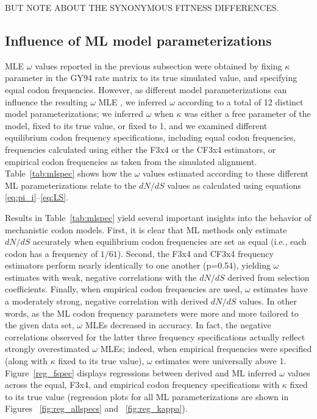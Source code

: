 \documentclass[11pt]{article}
\begin{document}
BUT NOTE ABOUT THE SYNONYMOUS FITNESS DIFFERENCES.


\subsection*{Influence of ML model parameterizations}

MLE $\omega$ values reported in the previous subsection were obtained by fixing $\kappa$ parameter in the GY94 rate matrix to its true simulated value, and specifying equal codon frequencies. However, as different model parameterizations can influence the resulting $\omega$ MLE \cite{YN00,Yang2006,ZhangYu2006}, we inferred $\omega$ according to a total of 12 distinct model parameterizations; we inferred $\omega$ when $\kappa$ was either a free parameter of the model, fixed to its true value, or fixed to 1, and we examined different equilibrium codon frequency specifications, including equal codon frequencies, frequencies calculated using either the F3x4 \cite{MuseGaut1994} or the CF3x4 \cite{Pond2010} estimators, or empirical codon frequencies as taken from the simulated alignment. Table~\ref{tab:mlspec} shows how the $\omega$ values estimated according to these different ML parameterizations relate to the $dN/dS$ values as calculated using equations \eqref{eq:pi_i}--\eqref{eq:LS}. 

Results in Table~\ref{tab:mlspec} yield several important insights into the behavior of mechanistic codon models. First, it is clear that ML methods only estimate $dN/dS$ accurately when equilibrium codon frequencies are set as equal (i.e., each codon has a frequency of $1/61$). Second, the F3x4 and CF3x4 frequency estimators perform nearly identically to one another (p=0.54), yielding $\omega$ estimates with weak, negative correlations with the $dN/dS$ derived from selection coefficients. Finally, when empirical codon frequencies are used, $\omega$ estimates have a moderately strong, negative correlation with derived $dN/dS$ values. In other words, as the ML codon frequency parameters were more and more tailored to the given data set, $\omega$ MLEs decreased in accuracy. In fact, the negative correlations observed for the latter three frequency specifications actually reflect strongly overestimated $\omega$ MLEs; indeed, when empirical frequencies were specified (along with $\kappa$ fixed to its true value), $\omega$ estimates were universally above 1.  Figure~\ref{reg_fspec} displays regressions between derived and ML inferred $\omega$ values across the equal, F3x4, and empirical codon frequency specifications with $\kappa$ fixed to its true value (regression plots for all ML parameterizations are shown in Figures ~\ref{fig:reg_allspecs} and ~\ref{fig:reg_kappa}).
\end{document}
